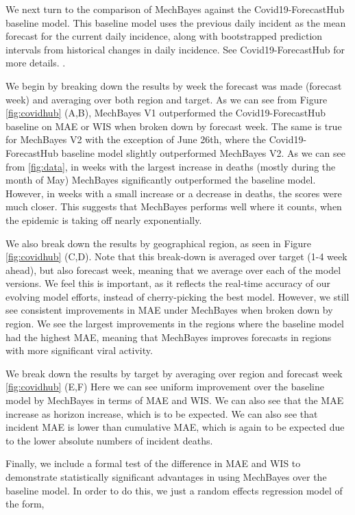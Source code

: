 \documentclass[11pt]{amsart}
\begin{document}
We next turn to the comparison of MechBayes against the Covid19-ForecastHub baseline model. This baseline model uses the previous daily incident as the mean forecast for the current daily incidence, along with  bootstrapped prediction intervals from historical changes in daily incidence. See Covid19-ForecastHub for more details. \cite{covidhub}. 

We begin by breaking down the results by week the forecast was made (forecast week) and averaging over both region and target. As we can see from Figure \ref{fig:covidhub} (A,B), MechBayes V1 outperformed the Covid19-ForecastHub baseline on MAE or WIS when broken down by forecast week. The same is true for MechBayes V2 with the exception of June 26th, where the Covid19-ForecastHub baseline model slightly outperformed MechBayes V2. As we can see from \ref{fig:data}, in weeks with the largest increase in deaths (mostly during the month of May) MechBayes significantly outperformed the baseline model. However, in weeks with a small increase or a decrease in deaths, the scores were much closer. This suggests that MechBayes performs well where it counts, when the epidemic is taking off nearly exponentially. 

We also break down the results by geographical region, as seen in Figure \ref{fig:covidhub} (C,D). Note that this break-down is averaged over target (1-4 week ahead), but also forecast week, meaning that we average over each of the model versions. We feel this is important, as it reflects the real-time accuracy of our evolving model efforts, instead of cherry-picking the best model. However, we still see consistent improvements in MAE under MechBayes when broken down by region. We see the largest improvements in the regions where the baseline model had the highest MAE, meaning that MechBayes improves forecasts in regions with more significant viral activity. 

We break down the results by target by averaging over region and forecast week  \ref{fig:covidhub} (E,F) Here we can see uniform improvement over the baseline model by MechBayes in terms of MAE and WIS. We can also see that the MAE increase as horizon increase, which is to be expected. We can also see that incident MAE is lower than cumulative MAE, which is again to be expected due to the lower absolute numbers of incident deaths. 

Finally, we include a formal test of the difference in MAE and WIS to demonstrate statistically significant advantages in using MechBayes over the baseline model. In order to do this, we just a random effects regression model of the form,
\end{document}
